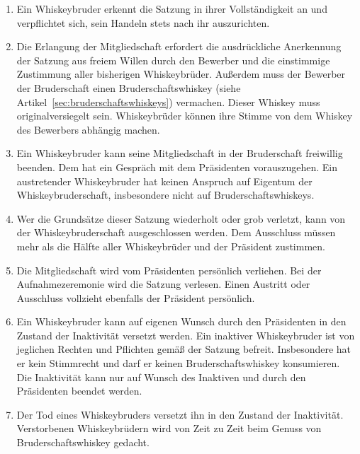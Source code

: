\documentclass[a4paper,12pt]{scrartcl}
\begin{document}
\begin{enumerate}

\item Ein Whiskeybruder erkennt die  Satzung in ihrer Vollständigkeit an und verpflichtet sich, sein
  Handeln stets nach ihr auszurichten.

\item Die Erlangung der Mitgliedschaft erfordert die ausdrückliche Anerkennung der Satzung aus
  freiem Willen durch den Bewerber und die einstimmige Zustimmung aller bisherigen Whiskeybrüder.
  Außerdem muss der Bewerber der Bruderschaft einen Bruderschaftswhiskey (siehe
  Artikel~\ref{sec:bruderschaftswhiskeys}) vermachen. Dieser Whiskey muss originalversiegelt sein.
  Whiskeybrüder können ihre Stimme von dem Whiskey des Bewerbers abhängig machen.

\item Ein Whiskeybruder kann seine Mitgliedschaft in der Bruderschaft freiwillig beenden. Dem hat
  ein Gespräch mit dem Präsidenten vorauszugehen. Ein austretender Whiskeybruder hat keinen Anspruch
  auf Eigentum der Whiskeybruderschaft, insbesondere nicht auf Bruderschaftswhiskeys.

\item Wer die Grundsätze dieser Satzung wiederholt oder grob verletzt, kann von der
  Whiskeybruderschaft ausgeschlossen werden. Dem Ausschluss müssen mehr als die Hälfte aller
  Whiskeybrüder und der Präsident zustimmen.

\item Die Mitgliedschaft wird vom Präsidenten persönlich verliehen. Bei der Aufnahmezeremonie wird
  die Satzung verlesen. Einen Austritt oder Ausschluss vollzieht ebenfalls der Präsident persönlich.

\item Ein Whiskeybruder kann auf eigenen Wunsch durch den Präsidenten in den Zustand der Inaktivität
  versetzt werden. Ein inaktiver Whiskeybruder ist von jeglichen Rechten und Pflichten gemäß der
  Satzung befreit. Insbesondere hat er kein Stimmrecht und darf er keinen Bruderschaftswhiskey
  konsumieren. Die Inaktivität kann nur auf Wunsch des Inaktiven und durch den Präsidenten beendet
  werden.

\item Der Tod eines Whiskeybruders versetzt ihn in den Zustand der Inaktivität. Verstorbenen
  Whiskeybrüdern wird von Zeit zu Zeit beim Genuss von Bruderschaftswhiskey gedacht.

\end{enumerate}
\end{document}
